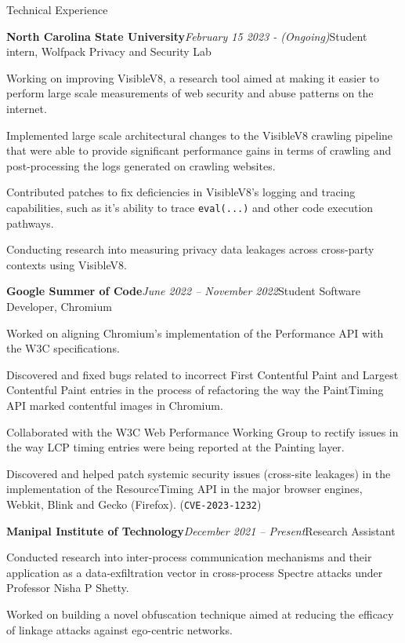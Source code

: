 \documentclass{resume} %
\begin{document}
\begin{rSection}{Technical Experience}
\begin{rSubsection}{\bf North Carolina State University}{\em February 15 2023 - (Ongoing)}{Student intern, Wolfpack Privacy and Security Lab}{}
\item Working on improving VisibleV8, a research tool aimed at making it easier to perform large scale measurements of web security and abuse patterns on the internet.
\item Implemented large scale architectural changes to the VisibleV8 crawling pipeline that were able to provide significant performance gains in terms of crawling and post-processing the logs generated on crawling websites.
\item Contributed patches to fix deficiencies in VisibleV8's logging and tracing capabilities, such as it's ability to trace \texttt{eval(...)} and other code execution pathways.
\item Conducting research into measuring privacy data leakages across cross-party contexts using VisibleV8.
\end{rSubsection}
\begin{rSubsection}{\bf Google Summer of Code}{\em June 2022 -- November 2022}{Student Software Developer, Chromium}{}
\item Worked on aligning Chromium's implementation of the Performance API with the W3C specifications.
\item Discovered and fixed bugs related to incorrect First Contentful Paint and Largest Contentful Paint entries in the process of refactoring the way the PaintTiming API marked contentful images in Chromium.
\item Collaborated with the W3C Web Performance Working Group to rectify issues in the way LCP timing entries were being reported at the Painting layer.
\item Discovered and helped patch systemic security issues (cross-site leakages) in the implementation of the ResourceTiming API in the major browser engines, Webkit, Blink and Gecko (Firefox). (\texttt{CVE-2023-1232})
\end{rSubsection}
\begin{rSubsection}{\bf Manipal Institute of Technology}{\em December 2021 -- Present}{Research Assistant}{}
\item Conducted research into inter-process communication mechanisms and their application as a data-exfiltration vector in cross-process Spectre attacks under Professor Nisha P Shetty.
\item Worked on building a novel obfuscation technique aimed at reducing the efficacy of linkage attacks against ego-centric networks.

\end{rSubsection}
\end{rSection}
\end{document}
